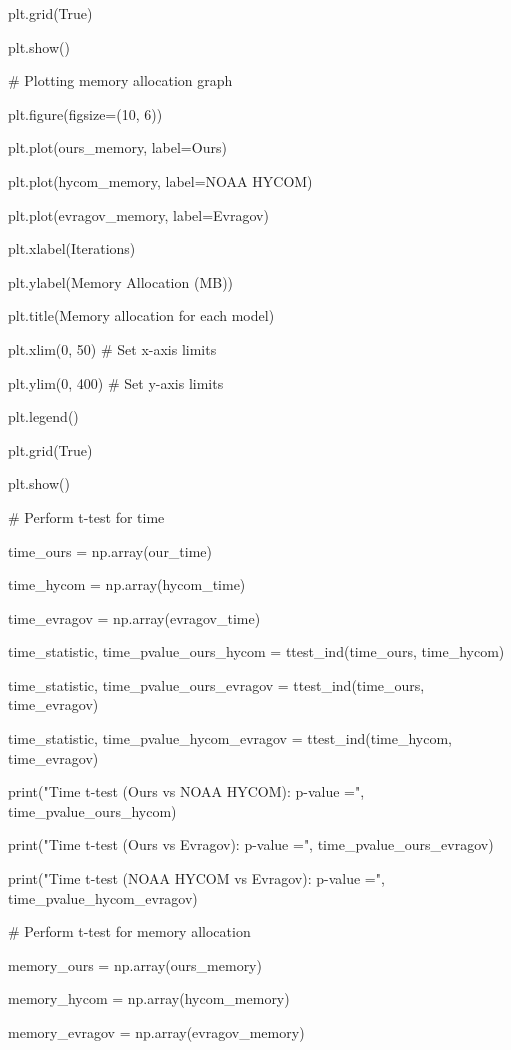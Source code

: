 plt.grid(True)

plt.show()

\# Plotting memory allocation graph

plt.figure(figsize=(10, 6))

plt.plot(ours\_memory, label=\textquotesingle Ours\textquotesingle)

plt.plot(hycom\_memory, label=\textquotesingle NOAA
HYCOM\textquotesingle)

plt.plot(evragov\_memory,
label=\textquotesingle Evragov\textquotesingle)

plt.xlabel(\textquotesingle Iterations\textquotesingle)

plt.ylabel(\textquotesingle Memory Allocation (MB)\textquotesingle)

plt.title(\textquotesingle Memory allocation for each
model\textquotesingle)

plt.xlim(0, 50) \# Set x-axis limits

plt.ylim(0, 400) \# Set y-axis limits

plt.legend()

plt.grid(True)

plt.show()

\# Perform t-test for time

time\_ours = np.array(our\_time)

time\_hycom = np.array(hycom\_time)

time\_evragov = np.array(evragov\_time)

time\_statistic, time\_pvalue\_ours\_hycom = ttest\_ind(time\_ours,
time\_hycom)

time\_statistic, time\_pvalue\_ours\_evragov = ttest\_ind(time\_ours,
time\_evragov)

time\_statistic, time\_pvalue\_hycom\_evragov = ttest\_ind(time\_hycom,
time\_evragov)

print("Time t-test (Ours vs NOAA HYCOM): p-value =",
time\_pvalue\_ours\_hycom)

print("Time t-test (Ours vs Evragov): p-value =",
time\_pvalue\_ours\_evragov)

print("Time t-test (NOAA HYCOM vs Evragov): p-value =",
time\_pvalue\_hycom\_evragov)

\# Perform t-test for memory allocation

memory\_ours = np.array(ours\_memory)

memory\_hycom = np.array(hycom\_memory)

memory\_evragov = np.array(evragov\_memory)

